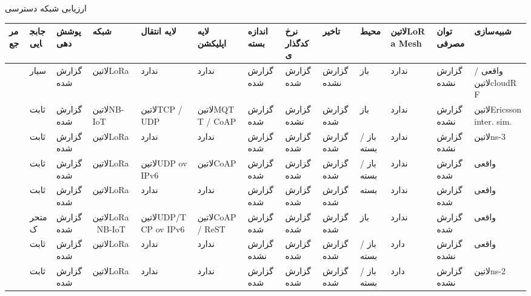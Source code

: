\documentclass[dvipsnames]{beamer}
\begin{document}
\begin{persian}
	\begin{frame}{ارزیابی شبکه دسترسی}
		\fontsize{5pt}{6pt}\selectfont
		\begin{tabularx}{\textwidth}{|*{13}{X|}}
			\toprule
			مرجع &
			جابجایی &
			پوشش‌دهی &
			شبکه &
			لایه انتقال &
			لایه اپلیکشن &
			اندازه بسته &
			نرخ کدگذاری &
			تاخیر &
			محیط &
			‌لاتین{LoRa Mesh} &
			توان مصرفی &
			شبیه‌سازی \\
			\midrule
			\cite{sensors-18-00772-v3} &
			سیار &
			گزارش شده &
			‌لاتین{LoRa} &
			ندارد &
			ندارد &
			گزارش شده &
			گزارش شده &
			گزارش نشده &
			باز &
			ندارد &
			گزارش نشده &
			واقعی / ‌لاتین{cloudRF} \\
			\midrule
			\cite{sensors-19-00007} &
			ثابت &
			گزارش شده &
			‌لاتین{NB-IoT} &
			‌لاتین{TCP / UDP} &
			‌لاتین{MQTT / CoAP} &
			گزارش شده &
			گزارش نشده &
			گزارش شده &
			باز &
			ندارد &
			گزارش نشده &
			‌لاتین{Ericsson inter. sim.} \\
			\midrule
			\cite{sensors-20-03061-v2} &
			ثابت &
			گزارش شده &
			‌لاتین{LoRa} &
			ندارد &
			ندارد &
			گزارش شده &
			گزارش شده &
			گزارش شده &
			باز / بسته &
			ندارد &
			گزارش نشده &
			‌لاتین{ns-3} \\
			\midrule
			\cite{sensors-20-00280-v2} &
			ثابت &
			گزارش شده &
			‌لاتین{LoRa} &
			‌لاتین{UDP ov IPv6} &
			‌لاتین{CoAP} &
			گزارش شده &
			گزارش شده &
			گزارش شده &
			باز / بسته &
			ندارد &
			گزارش شده &
			واقعی \\
			\midrule
			\cite{sensors-20-06721} &
			ثابت &
			گزارش شده &
			‌لاتین{LoRa} &
			ندارد &
			ندارد &
			گزارش شده &
			گزارش شده &
			گزارش شده &
			بسته &
			ندارد &
			گزارش شده &
			واقعی \\
			\midrule
			\cite{SanchezIborra2020} &
			متحرک &
			گزارش شده &
			‌لاتین{LoRa \ NB-IoT} &
			‌لاتین{UDP/TCP ov IPv6} &
			‌لاتین{CoAP / ReST} &
			گزارش شده &
			گزارش شده &
			گزارش شده &
			باز &
			ندارد &
			گزارش شده &
			واقعی \\
			\midrule
			\cite{Lee2018} &
			ثابت &
			گزارش شده &
			‌لاتین{LoRa} &
			ندارد &
			ندارد &
			گزارش نشده &
			گزارش شده &
			گزارش شده &
			باز / بسته &
			دارد &
			گزارش نشده &
			واقعی \\
			\midrule
			\cite{Marahatta2021} &
			ثابت &
			گزارش شده &
			‌لاتین{LoRa} &
			ندارد &
			ندارد &
			گزارش شده &
			گزارش شده &
			گزارش شده &
			باز / بسته &
			دارد &
			گزارش نشده &
			‌لاتین{ns-2} \\
			\bottomrule
		\end{tabularx}
	\end{frame}


\end{persian}
\end{document}
